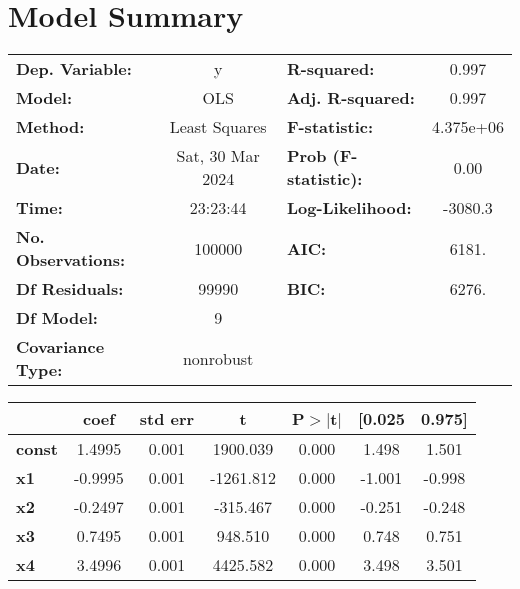 \documentclass[12pt]{article}
\begin{document}
\section{Model Summary}
\begin{center}
\begin{tabular}{lclc}
\toprule


\textbf{Dep. Variable:}    &        y         & \textbf{  R-squared:         } &     0.997   \\
\textbf{Model:}            &       OLS        & \textbf{  Adj. R-squared:    } &     0.997   \\
\textbf{Method:}           &  Least Squares   & \textbf{  F-statistic:       } & 4.375e+06   \\
\textbf{Date:}             & Sat, 30 Mar 2024 & \textbf{  Prob (F-statistic):} &     0.00    \\
\textbf{Time:}             &     23:23:44     & \textbf{  Log-Likelihood:    } &   -3080.3   \\
\textbf{No. Observations:} &      100000      & \textbf{  AIC:               } &     6181.   \\
\textbf{Df Residuals:}     &       99990      & \textbf{  BIC:               } &     6276.   \\
\textbf{Df Model:}         &           9      & \textbf{                     } &             \\
\textbf{Covariance Type:}  &    nonrobust     & \textbf{                     } &             \\
\bottomrule
\end{tabular}
\begin{tabular}{lcccccc}
               & \textbf{coef} & \textbf{std err} & \textbf{t} & \textbf{P$> |$t$|$} & \textbf{[0.025} & \textbf{0.975]}  \\
\midrule
\textbf{const} &       1.4995  &        0.001     &  1900.039  &         0.000        &        1.498    &        1.501     \\
\textbf{x1}    &      -0.9995  &        0.001     & -1261.812  &         0.000        &       -1.001    &       -0.998     \\
\textbf{x2}    &      -0.2497  &        0.001     &  -315.467  &         0.000        &       -0.251    &       -0.248     \\
\textbf{x3}    &       0.7495  &        0.001     &   948.510  &         0.000        &        0.748    &        0.751     \\
\textbf{x4}    &       3.4996  &        0.001     &  4425.582  &         0.000        &        3.498    &        3.501     \\

\end{tabular}
\end{center}
\end{document}
